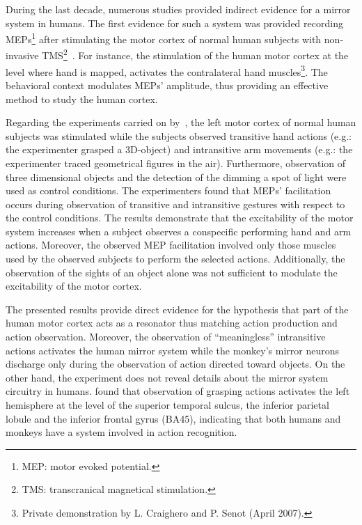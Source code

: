During the last decade, numerous studies provided indirect evidence for a mirror
system in humans. 
The first evidence for such a system was provided recording 
MEPs\footnote{MEP: motor evoked potential.} after stimulating the motor cortex
of normal human subjects with non-invasive
TMS\footnote{TMS: transcranical magnetical
stimulation.}~\citep{fadiga.etal:1995}.
For instance, the stimulation of the human motor cortex at the level where hand
is mapped, activates the contralateral hand muscles\footnote{Private
demonstration by L. Craighero and P. Senot (April 2007).}.
The behavioral context modulates MEPs' amplitude, thus providing
an effective method to study the human cortex.

Regarding the experiments carried on by~\citet{fadiga.etal:1995}, the left 
motor cortex of normal human subjects was stimulated 
while the subjects observed transitive hand actions (e.g.: the experimenter 
grasped a 3D-object) and intransitive arm movements (e.g.: the experimenter 
traced geometrical figures in the air).
Furthermore, observation of three dimensional objects and the detection of the
dimming a spot of light were used as control conditions.
The experimenters found that MEPs' facilitation occurs during observation of
transitive and intransitive gestures with respect to the control conditions.
The results demonstrate that the excitability of the motor system increases when
a subject observes a conspecific performing hand and arm actions.
Moreover, the observed MEP facilitation involved only those muscles used by the
observed subjects to perform the selected actions.
Additionally, the observation of the sights of an object alone was not
sufficient to modulate the excitability of the motor cortex.

The presented results provide direct evidence for the hypothesis that 
part of the human motor cortex acts as a resonator thus matching action
production and action observation.
Moreover, the observation of ``meaningless'' intransitive actions
activates the human mirror system while the monkey's mirror neurons discharge
only during the observation of action directed toward objects.
On the other hand, the experiment does not reveal details about the mirror
system circuitry in humans.
\citet{grafton.etal:1996} found that observation of grasping actions activates 
the left hemisphere at the level of the superior temporal sulcus, 
the inferior parietal lobule and the inferior frontal gyrus (BA45), indicating
that both humans and monkeys have a system involved in action recognition.

